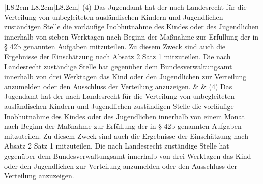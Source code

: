 \documentclass[10pt,a4paper,landscape]{article}
\begin{document}
\begin{longtable}{|L{8.2cm}|L{8.2cm}|L{8.2cm}|}
(4) Das Jugendamt hat der nach  \newline Landesrecht für die Verteilung von  \newline unbegleiteten ausländischen Kindern und  \newline Jugendlichen zuständigen Stelle die  \newline vorläufige Inobhutnahme des Kindes oder  \newline des Jugendlichen innerhalb von \textcolor{diffred}{sieben  \newline Werktagen} nach Beginn der Maßnahme  \newline zur Erfüllung der in \S{} 42b genannten  \newline Aufgaben mitzuteilen. Zu diesem Zweck  \newline sind auch die Ergebnisse der Einschätzung  \newline nach Absatz 2 Satz 1 mitzuteilen. Die nach  \newline Landesrecht zuständige Stelle hat  \newline gegenüber dem Bundesverwaltungsamt  \newline innerhalb von drei Werktagen das Kind  \newline oder den Jugendlichen zur Verteilung  \newline anzumelden oder den Ausschluss der  \newline Verteilung anzuzeigen. &  & (4) Das Jugendamt hat der nach  \newline Landesrecht für die Verteilung von  \newline unbegleiteten ausländischen Kindern und  \newline Jugendlichen zuständigen Stelle die  \newline vorläufige Inobhutnahme des Kindes oder  \newline des Jugendlichen innerhalb von \textcolor{diffgreen}{einem  \newline Monat} nach Beginn der Maßnahme zur  \newline Erfüllung der in \S{} 42b genannten Aufgaben  \newline mitzuteilen. Zu diesem Zweck sind auch  \newline die Ergebnisse der Einschätzung nach  \newline Absatz 2 Satz 1 mitzuteilen. Die nach  \newline Landesrecht zuständige Stelle hat  \newline gegenüber dem Bundesverwaltungsamt  \newline innerhalb von drei Werktagen das Kind  \newline oder den Jugendlichen zur Verteilung  \newline anzumelden oder den Ausschluss der  \newline Verteilung anzuzeigen. \\

\end{longtable}
\end{document}
